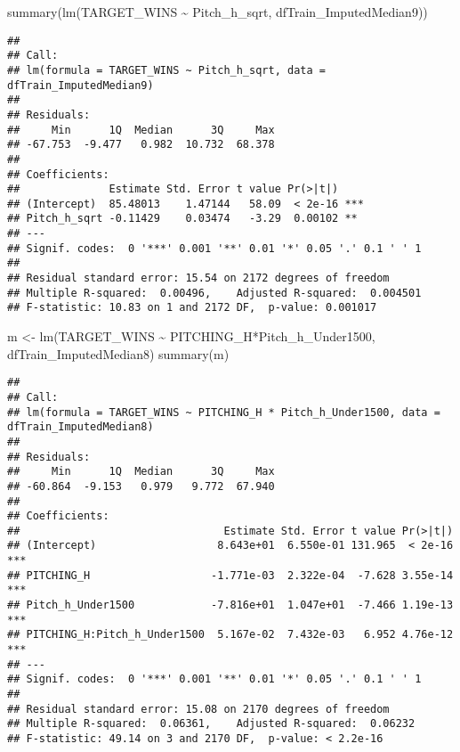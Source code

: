 \documentclass[
]{article}
\newenvironment{Shaded}{\begin{snugshade}}{\end{snugshade}}
\newcommand{\FunctionTok}[1]{\textcolor[rgb]{0.00,0.00,0.00}{#1}}
\newcommand{\NormalTok}[1]{#1}
\newcommand{\OtherTok}[1]{\textcolor[rgb]{0.56,0.35,0.01}{#1}}
\newcommand{\SpecialCharTok}[1]{\textcolor[rgb]{0.00,0.00,0.00}{#1}}
\begin{document}
\begin{Shaded}
\begin{Highlighting}[]
\FunctionTok{summary}\NormalTok{(}\FunctionTok{lm}\NormalTok{(TARGET\_WINS }\SpecialCharTok{\textasciitilde{}}\NormalTok{ Pitch\_h\_sqrt, dfTrain\_ImputedMedian9))}
\end{Highlighting}
\end{Shaded}

\begin{verbatim}
## 
## Call:
## lm(formula = TARGET_WINS ~ Pitch_h_sqrt, data = dfTrain_ImputedMedian9)
## 
## Residuals:
##     Min      1Q  Median      3Q     Max 
## -67.753  -9.477   0.982  10.732  68.378 
## 
## Coefficients:
##              Estimate Std. Error t value Pr(>|t|)    
## (Intercept)  85.48013    1.47144   58.09  < 2e-16 ***
## Pitch_h_sqrt -0.11429    0.03474   -3.29  0.00102 ** 
## ---
## Signif. codes:  0 '***' 0.001 '**' 0.01 '*' 0.05 '.' 0.1 ' ' 1
## 
## Residual standard error: 15.54 on 2172 degrees of freedom
## Multiple R-squared:  0.00496,    Adjusted R-squared:  0.004501 
## F-statistic: 10.83 on 1 and 2172 DF,  p-value: 0.001017
\end{verbatim}

\begin{Shaded}
\begin{Highlighting}[]
\NormalTok{m }\OtherTok{\textless{}{-}} \FunctionTok{lm}\NormalTok{(TARGET\_WINS }\SpecialCharTok{\textasciitilde{}}\NormalTok{ PITCHING\_H}\SpecialCharTok{*}\NormalTok{Pitch\_h\_Under1500, dfTrain\_ImputedMedian8)}
\FunctionTok{summary}\NormalTok{(m)}
\end{Highlighting}
\end{Shaded}

\begin{verbatim}
## 
## Call:
## lm(formula = TARGET_WINS ~ PITCHING_H * Pitch_h_Under1500, data = dfTrain_ImputedMedian8)
## 
## Residuals:
##     Min      1Q  Median      3Q     Max 
## -60.864  -9.153   0.979   9.772  67.940 
## 
## Coefficients:
##                                Estimate Std. Error t value Pr(>|t|)    
## (Intercept)                   8.643e+01  6.550e-01 131.965  < 2e-16 ***
## PITCHING_H                   -1.771e-03  2.322e-04  -7.628 3.55e-14 ***
## Pitch_h_Under1500            -7.816e+01  1.047e+01  -7.466 1.19e-13 ***
## PITCHING_H:Pitch_h_Under1500  5.167e-02  7.432e-03   6.952 4.76e-12 ***
## ---
## Signif. codes:  0 '***' 0.001 '**' 0.01 '*' 0.05 '.' 0.1 ' ' 1
## 
## Residual standard error: 15.08 on 2170 degrees of freedom
## Multiple R-squared:  0.06361,    Adjusted R-squared:  0.06232 
## F-statistic: 49.14 on 3 and 2170 DF,  p-value: < 2.2e-16
\end{verbatim}
\end{document}
